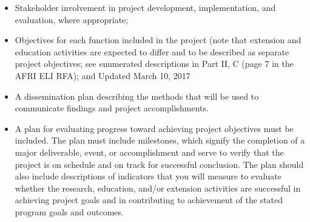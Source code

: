 \documentclass[12pt,letterpaper]{article}
\begin{document}
\begin{itemize}

  \item Stakeholder involvement in project development, implementation, and
   evaluation, where appropriate;

  \item Objectives for each function included in the project (note that extension
   and education activities are expected to differ and to be described as
   separate project objectives; see enumerated descriptions in Part II, C
   (page 7 in the AFRI ELI RFA); and Updated March 10, 2017

  \item A dissemination plan describing the methods that will be used to
   communicate findings and project accomplishments.

  \item A plan for evaluating progress toward achieving project objectives must be
   included. The plan must include milestones, which signify the completion of
   a major deliverable, event, or accomplishment and serve to verify that the
   project is on schedule and on track for successful conclusion. The plan
   should also include descriptions of indicators that you will measure to
   evaluate whether the research, education, and/or extension activities are
   successful in achieving project goals and in contributing to achievement of
   the stated program goals and outcomes.

\end{itemize}


\newpage
\AtBeginShipout{%
\AtBeginShipoutDiscard
}

\printbibliography
\end{document}
